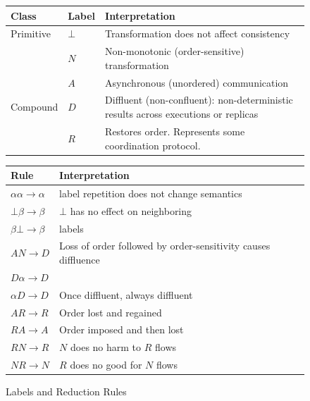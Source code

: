 \begin{figure}[t]
\begin{minipage}{.63\textwidth}
\footnotesize

\begin{tabular}{|l|l|p{7cm}|}
\hline
Class & Label & Interpretation \\ \hline
Primitive & $\bot$ & Transformation does not affect consistency \\ \cline{2-3}
& $N$ & Non-monotonic (order-sensitive) transformation \\ \cline{2-3}
& $A$ & Asynchronous (unordered) communication \\ \hline
Compound & $D$ & Diffluent (non-confluent): non-deterministic results across executions or replicas \\ \cline{2-3}
& $R$ & Restores order.  Represents some coordination protocol. \\ \hline

\end{tabular}




\end{minipage}
\begin{minipage}{.35\textwidth}
\raggedleft

\footnotesize
\begin{tabular}{|l|p{4cm}|}
\hline
Rule & Interpretation \\ \hline
$\alpha\alpha \rightarrow \alpha$ & label repetition does not change semantics \\ \hline
$\bot \beta \rightarrow \beta$ & $\bot$ has no effect on neighboring \\
$\beta \bot \rightarrow \beta$ & labels\\ \hline
$AN \rightarrow D$ & Loss of order followed by order-sensitivity causes diffluence \\ \hline
$D \alpha \rightarrow D$ & \\
$\alpha D \rightarrow D$ & Once diffluent, always diffluent\\ \hline
$AR \rightarrow R$ & Order lost and regained \\ \hline
$RA \rightarrow A$ & Order imposed and then lost \\ \hline
$RN \rightarrow R$ & $N$ does no harm to $R$ flows \\ \hline
$NR \rightarrow N$ & $R$ does no good for $N$ flows \\ \hline

\end{tabular}
\end{minipage}
\caption{Labels and Reduction Rules}
\label{fig:rules}
\end{figure}

